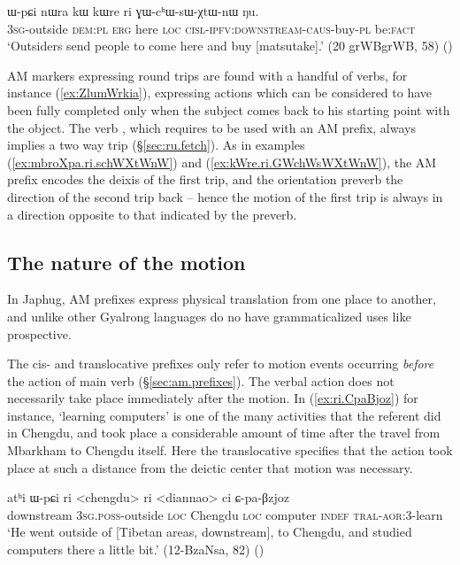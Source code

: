 \begin{exe}
\ex \label{ex:kWre.ri.GWchWsWXtWnW}
\gll   ɯ-pɕi nɯra kɯ kɯre ri ɣɯ-cʰɯ-sɯ-χtɯ-nɯ ŋu.  \\
  \textsc{3sg}-outside  \textsc{dem}:\textsc{pl}  \textsc{erg} here \textsc{loc} \textsc{cisl}-\textsc{ipfv}:\textsc{downstream}-\textsc{caus}-buy-\textsc{pl} be:\textsc{fact} \\ 
\glt `Outsiders send people to come here and buy [matsutake].' (20 grWBgrWB, 58)  
()
  \end{exe} 

AM markers expressing round trips are found with a handful of verbs, for instance  (\ref{ex:ZlumWrkia}), expressing actions which can be considered to have been fully completed only when the subject comes back to his starting point with the object.  The verb , which requires to be used with an AM prefix, always implies a two way trip (§\ref{sec:ru.fetch}). As in examples (\ref{ex:mbroXpa.ri.schWXtWnW}) and (\ref{ex:kWre.ri.GWchWsWXtWnW}), the AM prefix encodes the deixis of the first trip, and the orientation preverb the direction of the second trip back -- hence the motion of the first trip is always in a direction opposite to that indicated by the preverb.
 

\subsection{The nature of the motion} \label{sec:nature.of.motion.AM}
In Japhug, AM prefixes express physical translation from one place to another, and unlike other Gyalrong languages do no have grammaticalized uses like prospective. 

The cis- and translocative prefixes only refer to motion events occurring \textit{before} the action of main verb (§\ref{sec:am.prefixes}). The verbal action does not necessarily take place immediately after the motion. In (\ref{ex:ri.CpaBjoz}) for instance, `learning computers' is one of the many activities that the referent did in Chengdu, and took place a considerable amount of time after the travel from Mbarkham to Chengdu itself. Here the translocative specifies that the action took place at such a distance from the deictic center that motion was necessary.

\begin{exe}
\ex \label{ex:ri.CpaBjoz} 
\gll atʰi ɯ-pɕi ri <chengdu> ri <diannao> ci ɕ-pa-βzjoz \\
downstream \textsc{3sg}.\textsc{poss}-outside \textsc{loc} Chengdu \textsc{loc} computer \textsc{indef} \textsc{tral}-\textsc{aor}:3\flobv{}-learn \\
\glt `He went outside of [Tibetan areas, downstream], to Chengdu, and studied computers there a little bit.' (12-BzaNsa, 82)
()
\end{exe}

